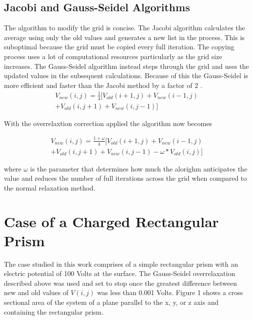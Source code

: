 \documentclass[aps,prb,twocolumn,amsfonts,showpacs,letterpaper]{revtex4}
\begin{document}
\subsection{Jacobi and Gauss-Seidel Algorithms}
The algorithm to modify the grid is concise. The Jacobi algorithm calculates the average using only the old values and generates a new list in the process. This is suboptimal because the grid must be copied every full iteration. The copying process uses a lot of computational resources particularly as the grid size increases. The Gauss-Seidel algorithm instead steps through the grid and uses the updated values in the subsequent calculations. Because of this the Gauss-Seidel is more efficient and faster than the Jacobi method by a factor of 2 \cite{gio}.
\begin{multline}
V_{new}(i,j) = \frac{1}{4}[V_{old}(i+1,j) + V_{new}(i-1,j)\\ + V_{old}(i,j+1) + V_{new}(i,j-1)]
\end{multline}

With the overrelaxtion correction applied the algorithm now becomes

\begin{multline}
V_{new}(i,j) = \frac{1+\omega}{4}[V_{old}(i+1,j) + V_{new}(i-1,j)\\ + V_{old}(i,j+1) + V_{new}(i,j-1)-\omega*V_{old}(i,j)]
\end{multline}

where $\omega$ is the parameter that determines how much the alorighm anticipates the value and reduces the number of full iterations across the grid when compared to the normal relaxation method.

\section{Case of a Charged Rectangular Prism}
The case studied in this work comprises of a simple rectangular prism with an electric potential of 100 Volts at the surface. The Gauss-Seidel overrelaxation described above was used and set to stop once the greatest difference between new and old values of $V(i,j)$ was less than 0.001 Volts. Figure 1 shows a cross sectional area of the system of a plane parallel to the x, y, or z axis and containing the rectangular prism.
\end{document}
